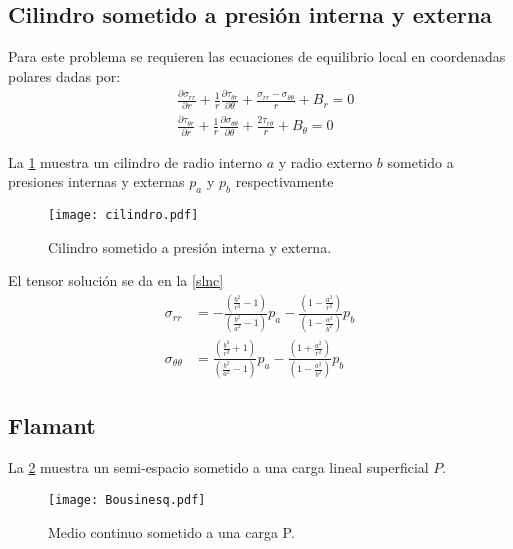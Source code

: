 \documentclass[../notas medios.tex]{subfiles}
\begin{document}
\subsection{Cilindro sometido a presión interna y externa}
Para este problema se requieren las ecuaciones de equilibrio local en coordenadas polares dadas por:
\begin{equation} \label{equcil}
\begin{split}
& \frac{{\partial {\sigma _{rr}}}}{{\partial r}} + \frac{1}{r}\frac{{\partial {\tau _{\theta r}}}}{{\partial \theta }} + \frac{{{\sigma _{rr}} - {\sigma _{\theta \theta }}}}{r} + {B_r} = 0 \\
& \frac{{\partial {\tau _{\theta r}}}}{{\partial r}} + \frac{1}{r}\frac{{\partial {\sigma _{\theta \theta }}}}{{\partial \theta }} + \frac{{2{\tau _{r\theta }}}}{r} + {B_\theta } = 0
\end{split}
\end{equation}

La \cref{cilindro} muestra un cilindro de radio interno $a$ y radio externo $b$ sometido a presiones internas y externas $p_a$ y $p_b$ respectivamente
\begin{figure}[H]
\centering
	\texttt{[image: cilindro.pdf]}
	\caption{Cilindro sometido a presión interna y externa.}
	\label{cilindro}
\end{figure}

El tensor solución se da en la \cref{slnc}\begin{equation}
\begin{split}
\sigma_{rr} & =  - \frac{\left( \frac{b^2}{r^2} - 1 \right)}{\left(\frac{b^2}{a^2} - 1\right)} p_a - \frac{\left(1 - \frac{a^2}{r^2} \right)} {\left(1 - \frac{a^2}{b^2} \right)} p_b \\
\sigma_{\theta\theta} & = \frac{\left(\frac{b^2}{r^2} + 1\right)}{\left(\frac{b^2}{a^2} - 1\right)} p_a - \frac{\left(1 + \frac{a^2}{r^2} \right)}{\left( 1 - \frac{a^2}{b^2}\right)} p_b
\end{split}
\label{slnc}
\end{equation}

\subsection{Flamant}
La \cref{Flamant} muestra un semi-espacio sometido a una carga lineal superficial \(P\). 

\begin{figure}[H]
\centering
	\texttt{[image: Bousinesq.pdf]}
	\caption{Medio continuo sometido a una carga P.}
	\label{Flamant}
\end{figure}
\end{document}
